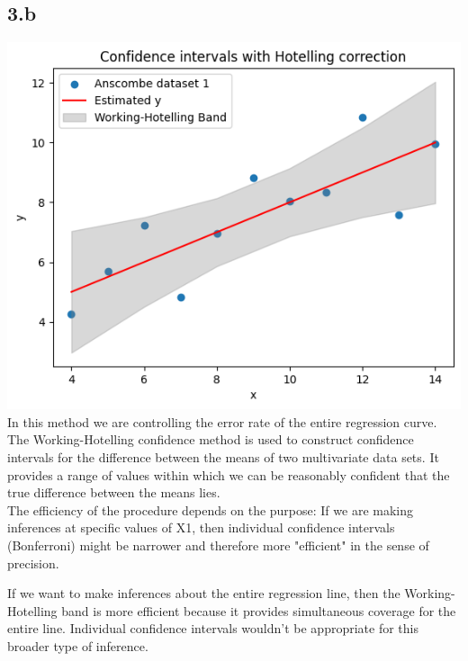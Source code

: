 \documentclass[12pt]{article}
\begin{document}
\newpage
\subsection*{3.b}
\includegraphics*[width=\linewidth]{graph3b}
In this method we are controlling the error rate of the entire regression curve.
\\
The Working-Hotelling confidence method is used to construct confidence
intervals for the difference between the means of two multivariate data sets.
It provides a range of values within which we can be reasonably confident that
the true difference between the means lies.
\\[\baselineskip]
The efficiency of the procedure depends on the purpose:
If we are making inferences at specific values of X1,
then individual confidence intervals (Bonferroni)
might be narrower and therefore more "efficient" in the sense of precision.

If we want to make inferences about the entire regression line,
then the Working-Hotelling band is more efficient because it provides
simultaneous coverage for the entire line.
Individual confidence intervals wouldn't be appropriate for this broader
type of inference.

\newpage
\end{document}
